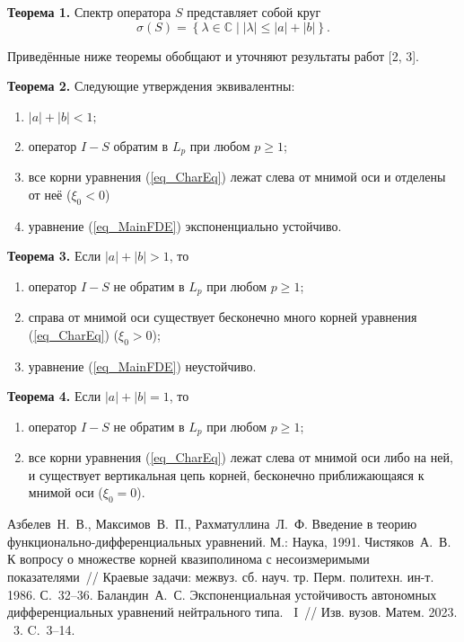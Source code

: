 \textbf{Теорема 1.} Спектр оператора \(S\) представляет собой круг
\begin{equation*}
\sigma\left(S\right)=\left\{\lambda\in\mathbb{C}\mid \left|\lambda\right|\le\left|a\right|+\left|b\right|\right\}.
\end{equation*}

Приведённые ниже теоремы обобщают и уточняют результаты работ [2, 3].

\textbf{Теорема 2.} Следующие утверждения эквивалентны:
\begin{enumerate}
    \item \(|a|+|b|<1;\)
    \item оператор \(I-S\) обратим в \(L_p\) при любом \(p\ge1\);
    \item все корни уравнения (\ref{eq_CharEq}) лежат слева от мнимой оси и отделены от неё (\(\xi_0<0\))
    \item уравнение (\ref{eq_MainFDE}) экспоненциально устойчиво.
\end{enumerate}

\textbf{Теорема 3.} Если \(|a|+|b|>1\), то
\begin{enumerate} 
    \item оператор \(I-S\) не обратим в \(L_p\) при любом \(p\ge1\);
    \item справа от мнимой оси существует бесконечно много корней уравнения (\ref{eq_CharEq}) (\(\xi_0>0\));
    \item уравнение (\ref{eq_MainFDE}) неустойчиво.
\end{enumerate}

\textbf{Теорема 4.} Если \(\left|a\right|+\left|b\right|=1\), то
\begin{enumerate} 
    \item оператор \(I-S\) не обратим в \(L_p\) при любом \(p\ge1\);
    \item все корни уравнения (\ref{eq_CharEq}) лежат слева от мнимой оси либо на ней, и существует вертикальная цепь корней, бесконечно приближающаяся к мнимой оси (\(\xi_0=0\)).
\end{enumerate}

\begin{thebibliography}{99}
Азбелев~Н.~В., Максимов~В.~П., Рахматуллина~Л.~Ф. Введение в теорию функ\-ци\-о\-наль\-но-дифференциальных уравнений. М.: Наука, 1991. %
 Чистяков~А.~В. К вопросу о множестве корней квазиполинома с несоизмеримыми показателями~// Краевые задачи: межвуз. сб. науч. тр. Перм. политехн. ин-т. 1986. С.~32--36.
 Баландин~А.~С. Экспоненциальная устойчивость автономных дифференциальных уравнений нейтрального типа.~ I~// Изв. вузов. Матем. 2023. \textnumero~3. C.~3--14.
\end{thebibliography}





%


